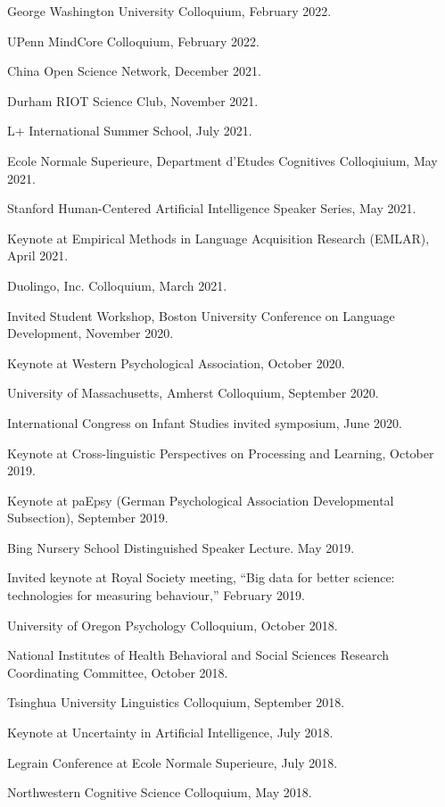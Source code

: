 \documentclass{article}
\renewenvironment{itemize}{
\begin{list}{}{
  \setlength{\leftmargin}{1.5em}
  }
  }{
\end{list}
}
\begin{document}
\begin{itemize}
  \item George Washington University Colloquium, February 2022.
  \item UPenn MindCore Colloquium, February 2022.
  \item China Open Science Network, December 2021.
  \item Durham RIOT Science Club, November 2021.
  \item L+ International Summer School, July 2021.
  \item Ecole Normale Superieure, Department d'Etudes Cognitives Colloqiuium, May 2021.
  \item Stanford Human-Centered Artificial Intelligence Speaker Series, May 2021.
  \item Keynote at Empirical Methods in Language Acquisition Research (EMLAR), April 2021.
  \item Duolingo, Inc. Colloquium, March 2021.
  \item Invited Student Workshop, Boston University Conference on Language Development, November 2020.
  \item Keynote at Western Psychological Association, October 2020.
  \item University of Massachusetts, Amherst Colloquium, September 2020.
  \item International Congress on Infant Studies invited symposium, June 2020.
  \item Keynote at Cross-linguistic Perspectives on Processing and Learning, October 2019.
  \item Keynote at paEpsy (German Psychological Association Developmental Subsection), September 2019.
  \item Bing Nursery School Distinguished Speaker Lecture. May 2019.
  \item Invited keynote at Royal Society meeting, ``Big data for better science: technologies for measuring behaviour,'' February 2019.
  \item University of Oregon Psychology Colloquium, October 2018.
  \item National Institutes of Health Behavioral and Social Sciences Research Coordinating Committee, October 2018.
  \item Tsinghua University Linguistics Colloquium, September 2018.
  \item Keynote at Uncertainty in Artificial Intelligence, July 2018.
  \item Legrain Conference at Ecole Normale Superieure, July 2018.
  \item Northwestern Cognitive Science Colloquium, May 2018.

\end{itemize}
\end{document}
